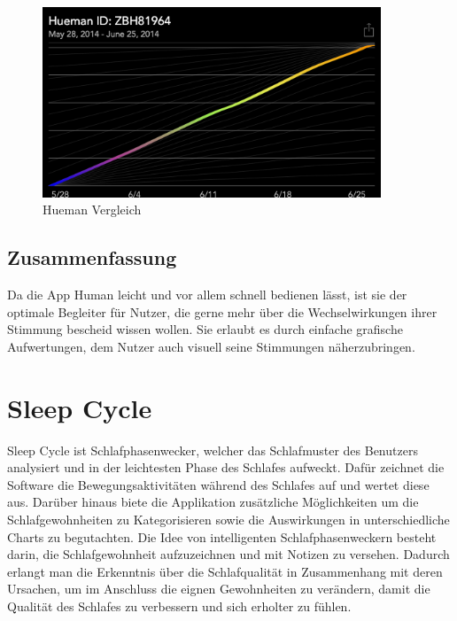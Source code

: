 \begin{figure}
\centering
\includegraphics[width=0.9\textwidth]{images/hueman-matched-data.PNG}
\caption{Hueman Vergleich \cite{fig:Vergleich}}
\label{fig:Vergleich}
\end{figure}

\subsection{Zusammenfassung}
\label{ch:Apps:sec:Moves:subsec:Verdict}

Da die App Human leicht und vor allem schnell bedienen lässt, ist sie der optimale Begleiter für Nutzer, die gerne mehr über die Wechselwirkungen ihrer Stimmung bescheid wissen wollen.
Sie erlaubt es durch einfache grafische Aufwertungen, dem Nutzer auch visuell seine Stimmungen näherzubringen.  


\section{Sleep Cycle}
\label{ch:Apps:sec:SleepCycle}

Sleep Cycle ist Schlafphasenwecker, welcher das Schlafmuster des Benutzers analysiert und in der leichtesten Phase des Schlafes aufweckt. \cite{web:SleepCycle}
Dafür zeichnet die Software die Bewegungsaktivitäten während des Schlafes auf und wertet diese aus.
Darüber hinaus biete die Applikation zusätzliche Möglichkeiten um die Schlafgewohnheiten zu Kategorisieren sowie die Auswirkungen in unterschiedliche Charts zu begutachten. 
Die Idee von intelligenten Schlafphasenweckern besteht darin, die Schlafgewohnheit aufzuzeichnen und mit Notizen zu versehen. Dadurch erlangt man die Erkenntnis über die Schlafqualität in Zusammenhang mit deren Ursachen, um im Anschluss die eignen Gewohnheiten zu verändern, damit die Qualität des Schlafes zu verbessern und sich erholter zu fühlen.

